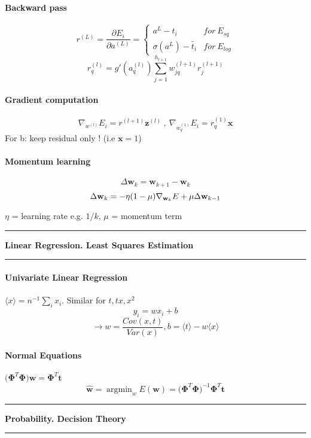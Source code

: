 \documentclass[7pt]{scrartcl}
\newlength{\secskip}
\renewcommand{\section}[1]{
  \vspace{\secskip}
  \hrule\vspace{.3em}
  \textbf{#1}
  \vspace{.3em}
  \hrule
  \vspace{\secskip}
}
\DeclareMathOperator*{\argmin}{argmin}
\renewcommand{\vec}{\mathbf}
\begin{document}
\begin{multicols}{4}
\paragraph{Backward pass}
\[r^{(L)}=\frac{\partial E_i}{\partial a^{(L)}} = \left\{ \begin{array}{ll}a^L - t_i & for~ E_{sq}  \\ \sigma(a^L) - \tilde{t_i} & for~ E_{log} \end{array} \right. \]
\[r_q^{(l)}=g'(a_q^{(l)})\sum_{j=1}^{h_{l+1}}w_{jq}^{(l+1)}r_j^{(l+1)}\]

\paragraph{Gradient computation}
\[\nabla_{w^{(l)}} E_i = r^{(l+1)} \vec{z}^{(l)} ~,~\nabla_{w_q^{(1)}} E_i = r_q^{(1)} \vec{x}\]
For b: keep residual only ! (i.e $\vec x = 1$)

\paragraph{Momentum learning}
\[\Delta \vec w_k = \vec w_{k+1}-\vec w_k\]
\[\Delta \vec w_k = -\eta(1-\mu)\nabla_{\textbf w_k}E+\mu \Delta \vec w_{k-1}\]

$\eta$ = learning rate e.g. $1/k$, $\mu$ = momentum term

\section{Linear Regression. Least Squares Estimation}
\paragraph{Univariate Linear Regression}
$\langle x \rangle = n^{-1} \sum_i x_i $. Similar for $t, tx, x^2$
\[y_i = wx_i + b \]
\[\rightarrow w=\frac{Cov(x,t)}{Var(x)}, b=\langle t \rangle - w \langle x \rangle \]

\paragraph{Normal Equations}
$ \vec{(\Phi}^{T}\vec{\Phi) w = \Phi}^{T} \vec{t}$
\[ \hat{\vec{w}} = \argmin_w E(\vec{w}) = \vec{(\Phi}^{T}\vec{\Phi)}^{-1} \vec{\Phi}^{T}  \vec{t} \]

\section{Probability. Decision Theory}

\end{multicols}
\end{document}
